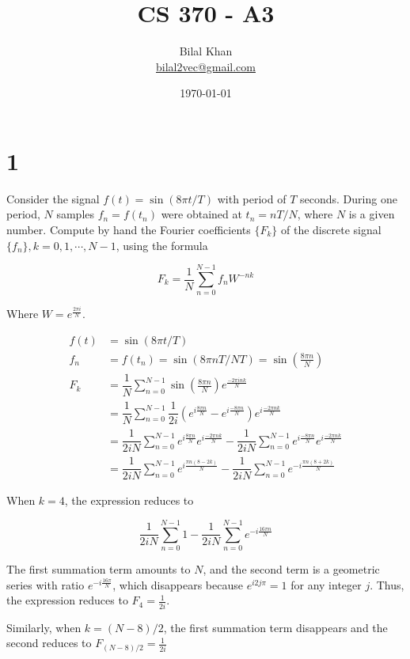 \documentclass[11pt]{article}
\title{CS 370 - A3}
\author{Bilal Khan\\
\href{mailto:bilal2vec@gmail.com}{bilal2vec@gmail.com}}
\date{\today}
\begin{document}
\maketitle

\tableofcontents

\section{1}

Consider the signal $f(t) = \sin(8 \pi t / T)$ with period of $T$ seconds. During one period, $N$ samples $f_n = f(t_n)$ were obtained at $t_n = nT/N$, where $N$ is a given number. Compute by hand the Fourier coefficients $\{ F_k \}$ of the discrete signal $\{ f_n \}, k = 0, 1, \cdots, N - 1$, using the formula

\[ F_k = \dfrac{1}{N} \sum_{n=0}^{N-1} f_n W^{-nk} \]

Where $W = e^{\frac{2 \pi i}{N}}$.

\begin{align*}
  f(t) &= \sin(8 \pi t / T) \\
  f_n &= f(t_n) = \sin(8 \pi  nT/N T) = \sin \left(\frac{8 \pi n}{N}\right) \\
  F_k &= \dfrac{1}{N} \sum_{n=0}^{N-1} \sin \left(\frac{8 \pi n}{N}\right) e^{\frac{-2 \pi i n k}{N}} \\
  &= \dfrac{1}{N} \sum_{n=0}^{N-1} \dfrac{1}{2 i} \left( e^{i \frac{8 \pi n}{N}} - e^{i \frac{- 8 \pi n}{N}} \right) e^{i \frac{-2 \pi n k}{N}} \\
  &= \dfrac{1}{2 i N} \sum_{n=0}^{N-1} e^{i \frac{8 \pi n}{N}} e^{i \frac{-2 \pi n k}{N}} - \dfrac{1}{2 i N} \sum_{n=0}^{N-1} e^{i \frac{-8 \pi n}{N}} e^{i \frac{-2 \pi n k}{N}} \\
  &= \dfrac{1}{2 i N} \sum_{n=0}^{N-1} e^{i \frac{\pi n (8 - 2k)}{N}} - \dfrac{1}{2 i N} \sum_{n=0}^{N-1} e^{-i \frac{\pi n (8 + 2k)}{N}}
\end{align*}

When $k = 4$, the expression reduces to 

\[ \dfrac{1}{2 i N} \sum_{n=0}^{N-1} 1 - \dfrac{1}{2 i N} \sum_{n=0}^{N-1} e^{-i \frac{16 \pi n}{N}} \]

The first summation term amounts to $N$, and the second term is a geometric series with ratio $e^{-i \frac{16 \pi}{N}}$, which disappears because $e^{i 2 j \pi} = 1$ for any integer $j$. Thus, the expression reduces to $F_4 = \frac{1}{2 i}$.

Similarly, when $k = (N - 8)/2$, the first summation term disappears and the second reduces to $F_{(N - 8)/2} = \frac{1}{2 i}$
\end{document}
